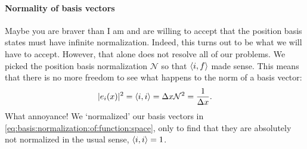 \documentclass[12pt, oneside]{report}    %
\begin{document}
\paragraph{Normality of basis vectors} Maybe you are braver than I am and are willing to accept that the position basis states must have infinite normalization. Indeed, this turns out to be what we will have to accept. However, that alone does not resolve all of our problems. We picked the position basis normalization $\mathcal N$ so that $\langle i, f\rangle$ made sense. This means that there is no more freedom to see what happens to the norm of a basis vector:
\begin{align}
    |e_i(x)|^2 = \langle i , i \rangle = \Delta x \mathcal N^2 = \frac{1}{\Delta x}.
\end{align}
What annoyance! We `normalized' our basis vectors in \eqref{eq:basis:normalization:of:function:space}, only to find that they are absolutely not normalized in the usual sense, $\langle i, i \rangle = 1$. 










\end{document}
